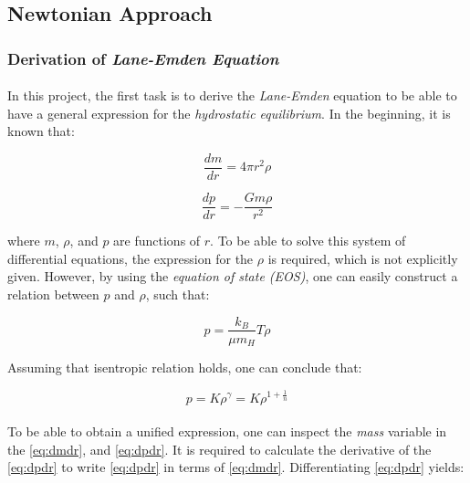 \documentclass[letterpaper,12pt]{article}
\begin{document}
\subsection{Newtonian Approach}

\subsubsection{Derivation of \textit{Lane-Emden Equation}}

\paragraph{} In this project, the first task is to derive the \textit{Lane-Emden} equation to be able to have a general expression for the \textit{hydrostatic equilibrium}. In the beginning, it is known that:

\begin{equation}
    \label{eq:dmdr}
    \frac{dm}{dr} = 4\pi r^2\rho
\end{equation}

\begin{equation}
    \label{eq:dpdr}
    \frac{dp}{dr} = -\frac{Gm\rho}{r^2}
\end{equation}

where $m$, $\rho$, and $p$ are functions of $r$. To be able to solve this system of differential equations, the expression for the $\rho$ is required, which is not explicitly given. However, by using the \textit{equation of state (EOS)}, one can easily construct a relation between $p$ and $\rho$, such that:

\begin{equation*}
    p = \frac{k_B}{\mu m_H}T\rho
\end{equation*}

Assuming that isentropic relation holds, one can conclude that:

\begin{equation}
    \label{eq:istro}
    p = K\rho^\gamma=K\rho^{1 + \frac{1}{n}} 
\end{equation}

\paragraph{} To be able to obtain a unified expression, one can inspect the \textit{mass} variable in the \eqref{eq:dmdr}, and \eqref{eq:dpdr}. It is required to calculate the derivative of the \eqref{eq:dpdr} to write \eqref{eq:dpdr} in terms of \eqref{eq:dmdr}. Differentiating \eqref{eq:dpdr} yields:
\end{document}
